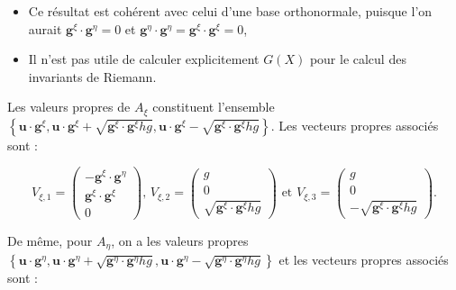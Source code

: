\begin{remarque}
\begin{itemize}
\item Ce résultat est cohérent avec celui d'une base orthonormale, puisque l'on aurait $\mathbf{g}^{\xi} \cdot \mathbf{g}^{\eta} = 0$ et $\mathbf{g}^{\eta} \cdot \mathbf{g}^{\eta} = \mathbf{g}^{\xi} \cdot \mathbf{g}^{\xi} = 0$,
\item Il n'est pas utile de calculer explicitement $G(X)$ pour le calcul des invariants de Riemann.
\end{itemize}

\end{remarque}

Les valeurs propres de $A_{\xi}$ constituent l'ensemble $\left\lbrace \mathbf{u} \cdot \mathbf{g}^{\xi}, \mathbf{u} \cdot \mathbf{g}^{\xi} + \sqrt{\mathbf{g}^{\xi} \cdot \mathbf{g}^{\xi} h g} , \mathbf{u} \cdot \mathbf{g}^{\xi} - \sqrt{\mathbf{g}^{\xi} \cdot \mathbf{g}^{\xi} h g}\right\rbrace$. Les vecteurs propres associés sont :

\begin{equation*}
V_{\xi,1} = \begin{pmatrix}
- \mathbf{g}^{\xi} \cdot \mathbf{g}^{\eta} \\
\mathbf{g}^{\xi} \cdot \mathbf{g}^{\xi} \\
0
\end{pmatrix}\text{, }
V_{\xi,2} = \begin{pmatrix}
g \\
0 \\
\sqrt{\mathbf{g}^{\xi} \cdot \mathbf{g}^{\xi} h g}
\end{pmatrix}\text{ et }
V_{\xi,3} = \begin{pmatrix}
g \\
0 \\
- \sqrt{\mathbf{g}^{\xi} \cdot \mathbf{g}^{\xi} h g}
\end{pmatrix}.
\end{equation*}

De même, pour $A_{\eta}$, on a les valeurs propres $\left\lbrace \mathbf{u} \cdot \mathbf{g}^{\eta}, \mathbf{u} \cdot \mathbf{g}^{\eta} + \sqrt{\mathbf{g}^{\eta} \cdot \mathbf{g}^{\eta} h g} , \mathbf{u} \cdot \mathbf{g}^{\eta} - \sqrt{\mathbf{g}^{\eta} \cdot \mathbf{g}^{\eta} h g}\right\rbrace$ et les vecteurs propres associés sont :


